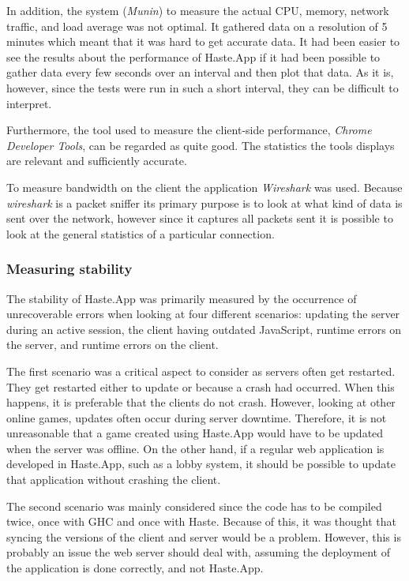 \documentclass[a4paper]{article}
\begin{document}
In addition, the system (\textit{Munin}) to measure the actual CPU, memory, network traffic, and load average was not optimal. It gathered data on a resolution of 5 minutes which meant that it was hard to get accurate data. It had been easier to see the results about the performance of Haste.App if it had been possible to gather data every few seconds over an interval and then plot that data. As it is, however, since the tests were run in such a short interval, they can be difficult to interpret.

Furthermore, the tool used to measure the client-side performance, \textit{Chrome Developer Tools}, can be regarded as quite good. The statistics the tools displays are relevant and sufficiently accurate. 

To measure bandwidth on the client the application \textit{Wireshark} was used. Because \textit{wireshark} is a packet sniffer its primary purpose is to look at what kind of data is sent over the network, however since it captures all packets sent it is possible to look at the general statistics of a particular connection.




\subsubsection{Measuring stability}
The stability of Haste.App was primarily measured by the occurrence of unrecoverable errors when looking at four different scenarios: updating the server during an active session, the client having outdated JavaScript, runtime errors on the server, and runtime errors on the client.

The first scenario was a critical aspect to consider as servers often get restarted. They get restarted either to update or because a crash had occurred. When this happens, it is preferable that the clients do not crash. However, looking at other online games, updates often occur during server downtime. Therefore, it is not unreasonable that a game created using Haste.App would have to be updated when the server was offline. On the other hand, if a regular web application is developed in Haste.App, such as a lobby system, it should be possible to update that application without crashing the client.

The second scenario was mainly considered since the code has to be compiled twice, once with GHC and once with Haste. Because of this, it was thought that syncing the versions of the client and server would be a problem. However, this is probably an issue the web server should deal with, assuming the deployment of the application is done correctly, and not Haste.App. 
\end{document}
